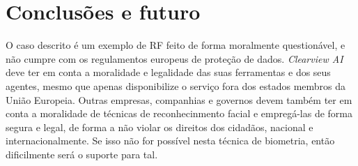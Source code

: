 \documentclass[12pt]{../diazessay}
\begin{document}
\section*{Conclusões e futuro}
O caso descrito é um exemplo de RF feito de forma moralmente questionável, e não cumpre com os regulamentos europeus de proteção de dados. \textit{Clearview AI} deve ter em conta a moralidade e legalidade das suas ferramentas e dos seus agentes, mesmo que apenas disponibilize o serviço fora dos estados membros da União Europeia. Outras empresas, companhias e governos devem também ter em conta a moralidade de técnicas de reconhecinmento facial e empregá-las de forma segura e legal, de forma a não violar os direitos dos cidadãos, nacional e internacionalmente. Se isso não for possível nesta técnica de biometria, então dificilmente será o suporte para tal.


\printbibliography[title=Referências]
\end{document}
